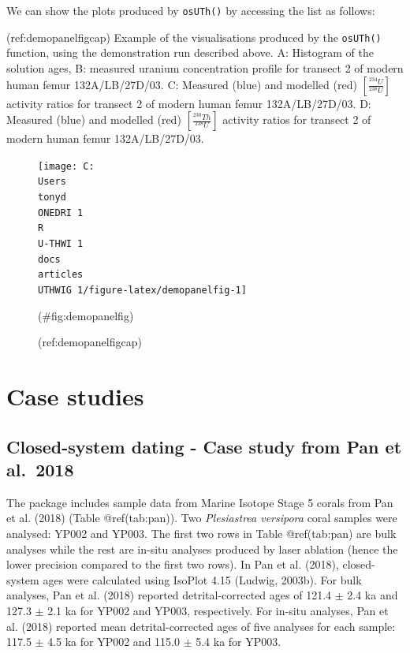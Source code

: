 \documentclass[]{elsarticle} %
\newenvironment{Shaded}{\begin{snugshade}}{\end{snugshade}}
\newcommand{\NormalTok}[1]{#1}
\newcommand{\SpecialCharTok}[1]{\textcolor[rgb]{0.00,0.00,0.00}{#1}}
\begin{document}
We can show the plots produced by \texttt{osUTh()} by accessing the list as follows:

(ref:demopanelfigcap) Example of the visualisations produced by the \texttt{osUTh()} function, using the demonstration run described above. A: Histogram of the solution ages, B: measured uranium concentration profile for transect 2 of modern human femur 132A/LB/27D/03. C: Measured (blue) and modelled (red) \([\frac{^{234}U}{^{238}U}]\) activity ratios for transect 2 of modern human femur 132A/LB/27D/03. D: Measured (blue) and modelled (red) \([\frac{^{230}Th}{^{238}U}]\) activity ratios for transect 2 of modern human femur 132A/LB/27D/03.

\begin{Shaded}
\end{Shaded}

\begin{figure}
\texttt{[image: C:\\Users\\tonyd\\ONEDRI~1\\R\\U-THWI~1\\docs\\articles\\UTHWIG~1/figure-latex/demopanelfig-1]} \caption{(ref:demopanelfigcap)}(\#fig:demopanelfig)
\end{figure}

\FloatBarrier

\newpage

\hypertarget{case-studies}{%
\section{Case studies}\label{case-studies}}

\hypertarget{closed-system-dating---case-study-from-pan-et-al.-2018}{%
\subsection{Closed-system dating - Case study from Pan et al.~2018}\label{closed-system-dating---case-study-from-pan-et-al.-2018}}

The package includes sample data from Marine Isotope Stage 5 corals from Pan et al. (2018) (Table @ref(tab:pan)). Two \emph{Plesiastrea versipora} coral samples were analysed: YP002 and YP003. The first two rows in Table @ref(tab:pan) are bulk analyses while the rest are in-situ analyses produced by laser ablation (hence the lower precision compared to the first two rows).
In Pan et al. (2018), closed-system ages were calculated using IsoPlot 4.15 (Ludwig, 2003b). For bulk analyses, Pan et al. (2018) reported detrital-corrected ages of 121.4 \(\pm\) 2.4 ka and 127.3 \(\pm\) 2.1 ka for YP002 and YP003, respectively. For in-situ analyses, Pan et al. (2018) reported mean detrital-corrected ages of five analyses for each sample: 117.5 \(\pm\) 4.5 ka for YP002 and 115.0 \(\pm\) 5.4 ka for YP003.
\end{document}
